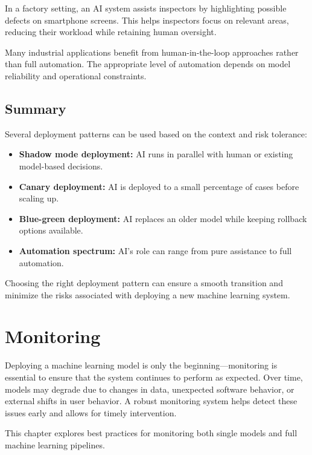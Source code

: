 \documentclass[12pt,openany]{book}
\begin{document}
\begin{examplebox}
   In a factory setting, an AI system assists inspectors by highlighting possible defects on smartphone screens. This helps inspectors focus on relevant areas, reducing their workload while retaining human oversight.
\end{examplebox}

Many industrial applications benefit from human-in-the-loop approaches rather than full automation. The appropriate level of automation depends on model reliability and operational constraints.



\section{Summary}

Several deployment patterns can be used based on the context and risk tolerance:

\begin{itemize}
    \item \textbf{Shadow mode deployment:} AI runs in parallel with human or existing model-based decisions.
    \item \textbf{Canary deployment:} AI is deployed to a small percentage of cases before scaling up.
    \item \textbf{Blue-green deployment:} AI replaces an older model while keeping rollback options available.
    \item \textbf{Automation spectrum:} AI’s role can range from pure assistance to full automation.
\end{itemize}

Choosing the right deployment pattern can ensure a smooth transition and minimize the risks associated with deploying a new machine learning system.




\chapter{Monitoring}

Deploying a machine learning model is only the beginning—monitoring is essential to ensure that the system continues to perform as expected. Over time, models may degrade due to changes in data, unexpected software behavior, or external shifts in user behavior. A robust monitoring system helps detect these issues early and allows for timely intervention.

This chapter explores best practices for monitoring both single models and full machine learning pipelines.
\end{document}
